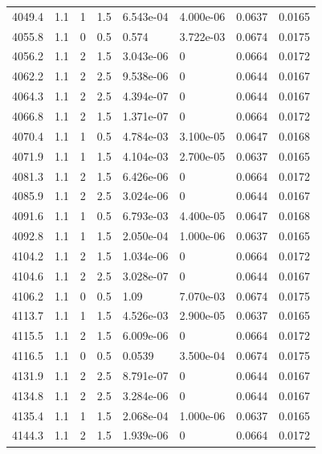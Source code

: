 \documentclass[preview]{standalone}
\begin{document}
{{{{{{{{{{{{{{{\begin{tabular}{L{1.2cm}C{1.2cm} C{0.3cm}C{0.5cm} C{1.4cm}C{1.4cm} C{1.4cm}C{1.4cm}}
  4049.4  &   1.1  & 1     & 1.5 &  6.543e-04  & 4.000e-06  & 0.0637 &  0.0165   \\ 
  4055.8  &   1.1  & 0     & 0.5 &  0.574  & 3.722e-03  & 0.0674 &  0.0175   \\ 
  4056.2  &   1.1  & 2     & 1.5 &  3.043e-06  & 0  & 0.0664 &  0.0172   \\ 
  4062.2  &   1.1  & 2     & 2.5 &  9.538e-06  & 0  & 0.0644 &  0.0167   \\ 
  4064.3  &   1.1  & 2     & 2.5 &  4.394e-07  & 0  & 0.0644 &  0.0167   \\ 
  4066.8  &   1.1  & 2     & 1.5 &  1.371e-07  & 0  & 0.0664 &  0.0172   \\ 
  4070.4  &   1.1  & 1     & 0.5 &  4.784e-03  & 3.100e-05  & 0.0647 &  0.0168   \\ 
  4071.9  &   1.1  & 1     & 1.5 &  4.104e-03  & 2.700e-05  & 0.0637 &  0.0165   \\ 
  4081.3  &   1.1  & 2     & 1.5 &  6.426e-06  & 0  & 0.0664 &  0.0172   \\ 
  4085.9  &   1.1  & 2     & 2.5 &  3.024e-06  & 0  & 0.0644 &  0.0167   \\ 
  4091.6  &   1.1  & 1     & 0.5 &  6.793e-03  & 4.400e-05  & 0.0647 &  0.0168   \\ 
  4092.8  &   1.1  & 1     & 1.5 &  2.050e-04  & 1.000e-06  & 0.0637 &  0.0165   \\ 
  4104.2  &   1.1  & 2     & 1.5 &  1.034e-06  & 0  & 0.0664 &  0.0172   \\ 
  4104.6  &   1.1  & 2     & 2.5 &  3.028e-07  & 0  & 0.0644 &  0.0167   \\ 
  4106.2  &   1.1  & 0     & 0.5 &  1.09  & 7.070e-03  & 0.0674 &  0.0175   \\ 
  4113.7  &   1.1  & 1     & 1.5 &  4.526e-03  & 2.900e-05  & 0.0637 &  0.0165   \\ 
  4115.5  &   1.1  & 2     & 1.5 &  6.009e-06  & 0  & 0.0664 &  0.0172   \\ 
  4116.5  &   1.1  & 0     & 0.5 &  0.0539  & 3.500e-04  & 0.0674 &  0.0175   \\ 
  4131.9  &   1.1  & 2     & 2.5 &  8.791e-07  & 0  & 0.0644 &  0.0167   \\ 
  4134.8  &   1.1  & 2     & 2.5 &  3.284e-06  & 0  & 0.0644 &  0.0167   \\ 
  4135.4  &   1.1  & 1     & 1.5 &  2.068e-04  & 1.000e-06  & 0.0637 &  0.0165   \\ 
  4144.3  &   1.1  & 2     & 1.5 &  1.939e-06  & 0  & 0.0664 &  0.0172   \\ 

\end{tabular}}}}}}}}}}}}}}}}
\end{document}
